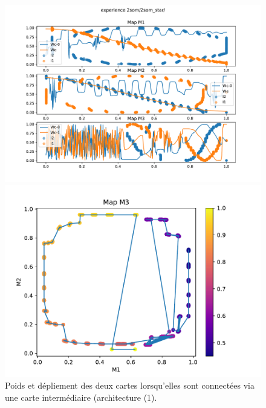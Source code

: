 \begin{figure}[h!]
\begin{minipage}{0.5\textwidth}
\includegraphics[width=\textwidth]{2som_star_w.pdf}
\end{minipage}
\begin{minipage}{0.5\textwidth}
\includegraphics[width=\textwidth]{2som_star_dw3.pdf}
\end{minipage}
\caption{Poids et dépliement des deux cartes lorsqu'elles sont connectées via une carte intermédiaire (architecture (1).}
\end{figure}


